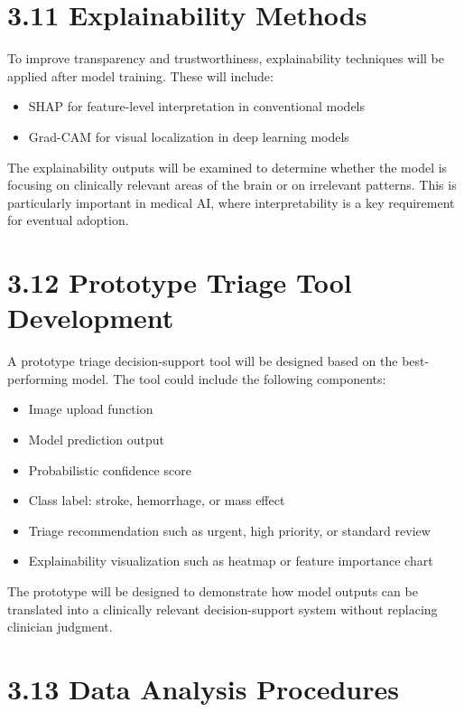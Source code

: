 \documentclass[12pt,a4paper]{report}
\begin{document}
\section{3.11 Explainability Methods}

To improve transparency and trustworthiness, explainability techniques will be applied after model training. These will include:

\begin{itemize}
\item SHAP for feature-level interpretation in conventional models
\item Grad-CAM for visual localization in deep learning models
\end{itemize}

The explainability outputs will be examined to determine whether the model is focusing on clinically relevant areas of the brain or on irrelevant patterns. This is particularly important in medical AI, where interpretability is a key requirement for eventual adoption.

\section{3.12 Prototype Triage Tool Development}

A prototype triage decision-support tool will be designed based on the best-performing model. The tool could include the following components:

\begin{itemize}
\item Image upload function
\item Model prediction output
\item Probabilistic confidence score
\item Class label: stroke, hemorrhage, or mass effect
\item Triage recommendation such as urgent, high priority, or standard review
\item Explainability visualization such as heatmap or feature importance chart
\end{itemize}

The prototype will be designed to demonstrate how model outputs can be translated into a clinically relevant decision-support system without replacing clinician judgment.

\section{3.13 Data Analysis Procedures}
\end{document}
